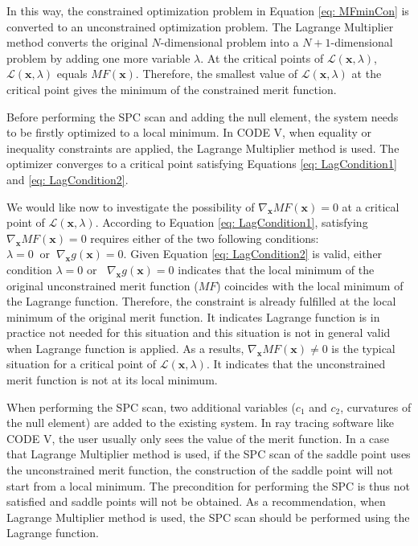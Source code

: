 In this way, the constrained optimization problem in Equation \ref{eq: MFminCon} is converted to an unconstrained optimization problem. The Lagrange Multiplier method converts the original $N$-dimensional problem into a $N+1$-dimensional problem by adding one more variable $\lambda$.  At the critical points of $\mathcal{L}(\textbf{x},\lambda)$, $\mathcal{L}(\textbf{x},\lambda)$ equals $MF(\textbf{x})$. Therefore, the smallest value of $\mathcal{L}(\textbf{x},\lambda)$ at the critical point gives the minimum of the constrained merit function. 

Before performing the SPC scan and adding the null element, the system needs to be firstly optimized to a local minimum. In CODE V, when equality or inequality constraints are applied, the Lagrange Multiplier method is used. The optimizer converges to a critical point satisfying Equations \ref{eq: LagCondition1} and \ref{eq: LagCondition2}. 

We would like now to investigate the possibility of $\nabla_\textbf{x}MF(\textbf{x}) = 0$ at a critical point of $\mathcal{L}(\textbf{x},\lambda)$. According to Equation \ref{eq: LagCondition1}, satisfying $\nabla_\textbf{x}MF(\textbf{x}) = 0$ requires either of the two following conditions: $\lambda =0 \;\; \text{or} \;\; \nabla_\textbf{x}g(\textbf{x})=0$. Given Equation \ref{eq: LagCondition2} is valid, either condition $\lambda = 0$ or $\;\; \nabla_\textbf{x}g(\textbf{x})=0$ indicates that the local minimum of the original unconstrained merit function ($MF$) coincides with the local minimum of the Lagrange function. Therefore, the constraint is already fulfilled at the local minimum of the original merit function. It indicates Lagrange function is in practice not needed for this situation and this situation is not in general valid when Lagrange function is applied. As a results, $\nabla_\textbf{x}MF(\textbf{x}) \ne 0$ is the typical situation for a critical point of $\mathcal{L}(\textbf{x},\lambda)$. It indicates that the unconstrained merit function is not at its local minimum.  

When performing the SPC scan, two additional variables ($c_1$ and $c_2$, curvatures of the null element) are added to the existing system. In ray tracing software like CODE V, the user usually only sees the value of the merit function. In a case that Lagrange Multiplier method is used, if the SPC scan of the saddle point uses the unconstrained merit function, the construction of the saddle point will not start from a local minimum. The precondition for performing the SPC is thus not satisfied and saddle points will not be obtained. As a recommendation, when Lagrange Multiplier method is used, the SPC scan should be performed using the Lagrange function.  

